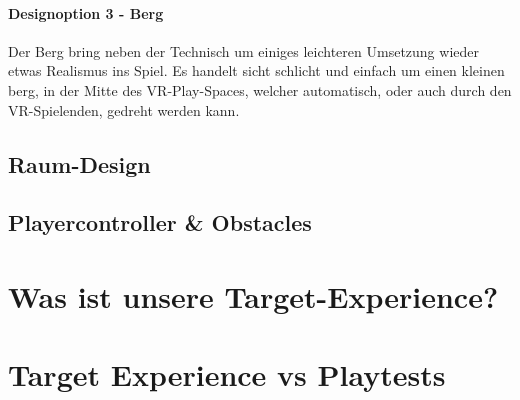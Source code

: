 \paragraph{Designoption 3 - Berg}

Der Berg bring neben der Technisch um einiges leichteren Umsetzung wieder etwas Realismus ins Spiel. Es handelt sicht schlicht und einfach um einen kleinen berg, in der Mitte des VR-Play-Spaces, welcher automatisch, oder auch durch den VR-Spielenden, gedreht werden kann.

\subsection{Raum-Design}

\subsection{Playercontroller \& Obstacles}

\section{Was ist unsere Target-Experience?}

\section{Target Experience vs Playtests}
